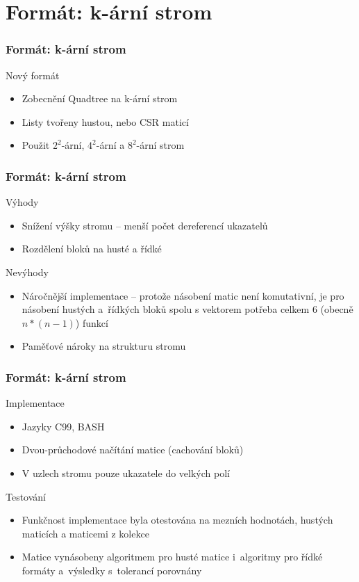 \documentclass{beamer}
\begin{document}
\section{Formát: k-ární strom}
\begin{frame}
	\frametitle{Formát: k-ární strom}
	\begin{exampleblock}{Nový formát}
		\begin{itemize}
			\item Zobecnění Quadtree na k-ární strom
			\item Listy tvořeny hustou, nebo CSR maticí
			\item Použit $2^2$-ární, $4^2$-ární a $8^2$-ární strom
		\end{itemize}
	\end{exampleblock}
\end{frame}
\begin{frame}
	\frametitle{Formát: k-ární strom}
	\begin{exampleblock}{Výhody}
		\begin{itemize}
			\item Snížení výšky stromu -- menší počet dereferencí ukazatelů
			\item Rozdělení bloků na husté a řídké
		\end{itemize}
	\end{exampleblock}
	\begin{alertblock}{Nevýhody}
		\begin{itemize}
			\item Náročnější implementace -- protože násobení matic není komutativní, je pro násobení hustých a~řídkých bloků spolu s vektorem potřeba celkem 6 (obecně $n*(n-1)$) funkcí
			\item Pamě\v{t}ové nároky na strukturu stromu
		\end{itemize}
	\end{alertblock}
\end{frame}
\begin{frame}
	\frametitle{Formát: k-ární strom}
	\begin{exampleblock}{Implementace}
		\begin{itemize}
			\item Jazyky C99, BASH
			\item Dvou-průchodové načítání matice (cachování bloků)
			\item V uzlech stromu pouze ukazatele do velkých polí
		\end{itemize}
	\end{exampleblock}
	\begin{exampleblock}{Testování}
		\begin{itemize}
			\item Funkčnost implementace byla otestována na mezních hodnotách, hustých maticích a maticemi z kolekce
			\item Matice vynásobeny algoritmem pro husté matice i~algoritmy pro řídké formáty a~výsledky s~tolerancí porovnány
		\end{itemize}
	\end{exampleblock}

\end{frame}
\end{document}

